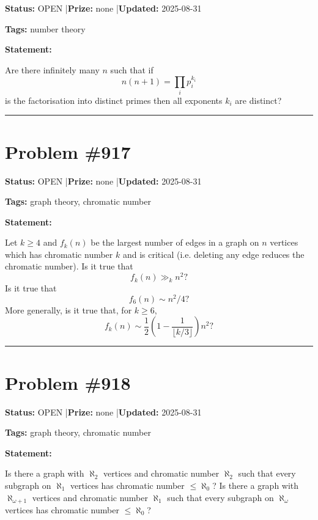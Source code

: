 \documentclass{article}
\begin{document}
\noindent\textbf{Status:} OPEN \quad|\quad \textbf{Prize:} none \quad|\quad \textbf{Updated:} 2025-08-31

\noindent\textbf{Tags:} number theory

\medskip

\noindent\textbf{Statement:}

Are there infinitely many $n$ such that if\[n(n+1) = \prod_i p_i^{k_i}\]is the factorisation into distinct primes then all exponents $k_i$ are distinct?

\noindent\rule{\linewidth}{0.4pt}


\section{Problem \#917}
\label{prob:917}

\noindent\textbf{Status:} OPEN \quad|\quad \textbf{Prize:} none \quad|\quad \textbf{Updated:} 2025-08-31

\noindent\textbf{Tags:} graph theory, chromatic number

\medskip

\noindent\textbf{Statement:}

Let $k\geq 4$ and $f_k(n)$ be the largest number of edges in a graph on $n$ vertices which has chromatic number $k$ and is critical (i.e. deleting any edge reduces the chromatic number). Is it true that\[f_k(n) \gg_k n^2?\]Is it true that\[f_6(n)\sim n^2/4?\]More generally, is it true that, for $k\geq 6$,\[f_k(n) \sim \frac{1}{2}\left(1-\frac{1}{\lfloor k/3\rfloor}\right)n^2?\]

\noindent\rule{\linewidth}{0.4pt}


\section{Problem \#918}
\label{prob:918}

\noindent\textbf{Status:} OPEN \quad|\quad \textbf{Prize:} none \quad|\quad \textbf{Updated:} 2025-08-31

\noindent\textbf{Tags:} graph theory, chromatic number

\medskip

\noindent\textbf{Statement:}

Is there a graph with $\aleph_2$ vertices and chromatic number $\aleph_2$ such that every subgraph on $\aleph_1$ vertices has chromatic number $\leq\aleph_0$? Is there a graph with $\aleph_{\omega+1}$ vertices and chromatic number $\aleph_1$ such that every subgraph on $\aleph_\omega$ vertices has chromatic number $\leq\aleph_0$?
\end{document}

